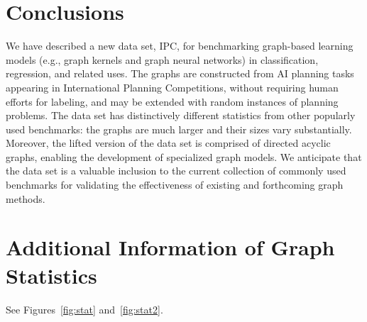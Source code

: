 \documentclass{article}
\begin{document}
\section{Conclusions}\label{sec:conclude}
We have described a new data set, IPC, for benchmarking graph-based learning models (e.g., graph kernels and graph neural networks) in classification, regression, and related uses. The graphs are constructed from AI planning tasks appearing in International Planning Competitions, without requiring human efforts for labeling, and may be extended with random instances of planning problems. The data set has distinctively different statistics from other popularly used benchmarks: the graphs are much larger and their sizes vary substantially. Moreover, the lifted version of the data set is comprised of directed acyclic graphs, enabling the development of specialized graph models. We anticipate that the data set is a valuable inclusion to the current collection of commonly used benchmarks for validating the effectiveness of existing and forthcoming graph methods.









\appendix
\section{Additional Information of Graph Statistics}
See Figures~\ref{fig:stat} and~\ref{fig:stat2}.

\begin{figure*}[ht]
\centering
{}
\\
\caption{Box plot of the graph size distribution. The orange bar marks the median; the red cross the mean.}
\label{fig:stat}
\end{figure*}
\end{document}
